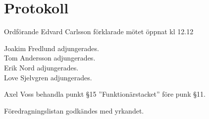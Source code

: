 \documentclass[10pt]{article}
\def\mo{Edvard Carlsson}
\begin{document}
\section*{Protokoll}
\begin{paragrafer}
Ordförande {\mo} förklarade mötet öppnat kl 12.12

{\valavmo}

{\valavms}

{\valavj}

{\tosg}

Joakim Fredlund adjungerades.\\
Tom Andersson adjungerades.\\
Erik Nord adjungerades.\\
Love Sjelvgren adjungerades. 






Axel Voss \ypa behandla punkt \S15 ''Funktionärstacket'' före punk \S11.

Föredragningslistan godkändes med yrkandet.

\textit{\ingaprot}

\begin{fyllnadsval} %


\end{fyllnadsval}
\end{paragrafer}
\end{document}
